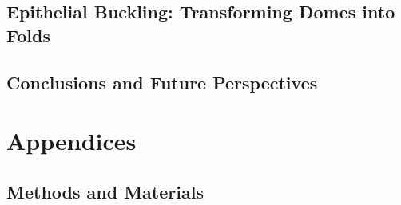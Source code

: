 \documentclass[11pt, final, a4paper, twoside, openright]{book}
\begin{document}
	\renewcommand{\thesection}{8.\arabic{section}}
	\hypertarget{epithelial-buckling-transforming-domes-into-folds}{%
	\chapter{Epithelial Buckling: Transforming Domes into
	Folds}\label{epithelial-buckling-transforming-domes-into-folds}}
	
	
	\renewcommand{\thesection}{9.\arabic{section}}
	\hypertarget{chapter-9}{%
	\chapter{Conclusions and Future Perspectives}\label{chapter-9}}
	
	


	\part{Appendices}
	\begin{appendices}
		\renewcommand{\thesection}{A.\arabic{section}}
		\chapter{Methods and Materials}   \label{appendix_1}
		
	\end{appendices}
	
	\backmatter
	
	
\end{document}
